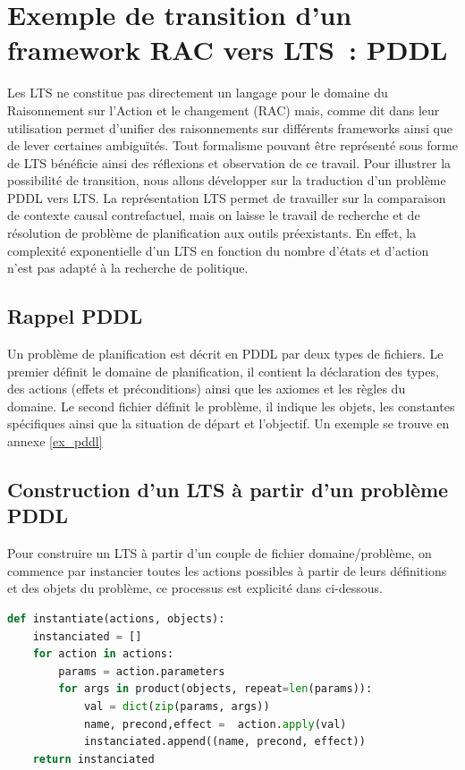 \section{Exemple de transition d'un framework RAC vers LTS : PDDL}

Les LTS ne constitue pas directement un langage pour le domaine du Raisonnement sur l'Action et le changement (RAC) mais, comme dit dans \cite{sarmiento_formalising_2025} leur utilisation permet d'unifier des raisonnements sur différents frameworks ainsi que de lever certaines ambiguïtés. Tout formalisme pouvant être représenté sous forme de LTS bénéficie ainsi des réflexions et observation de ce travail. Pour illustrer la possibilité de transition, nous allons développer sur la traduction d'un problème PDDL vers LTS. La représentation LTS permet de travailler sur la comparaison de contexte causal contrefactuel, mais on laisse le travail de recherche et de résolution de problème de planification aux outils préexistants. En effet, la complexité exponentielle d'un LTS en fonction du nombre d'états et d'action n'est pas adapté à la recherche de politique.


\subsection{Rappel PDDL}

Un problème de planification est décrit en PDDL par deux types de fichiers. Le premier définit le domaine de planification, il contient la déclaration des types, des actions (effets et préconditions) ainsi que les axiomes et les règles du domaine. Le second fichier définit le problème, il indique les objets, les constantes spécifiques ainsi que la situation de départ et l'objectif. Un exemple se trouve en annexe \ref{ex_pddl}


\subsection{Construction d'un LTS à partir d'un problème PDDL}
Pour construire un LTS à partir d'un couple de fichier domaine/problème, on commence par instancier toutes les actions possibles à partir de leurs définitions et des objets du problème, ce processus est explicité dans ci-dessous.

\hfill
\begin{lstlisting}[language=Python, basicstyle=\small\ttfamily,
                   commentstyle=\color{gray}\itshape,
                   keywordstyle=\bfseries]
def instantiate(actions, objects):
    instanciated = []
    for action in actions:
        params = action.parameters
        for args in product(objects, repeat=len(params)):
            val = dict(zip(params, args))
            name, precond,effect =  action.apply(val)  
            instanciated.append((name, precond, effect))
    return instanciated
\end{lstlisting}
\hfill

